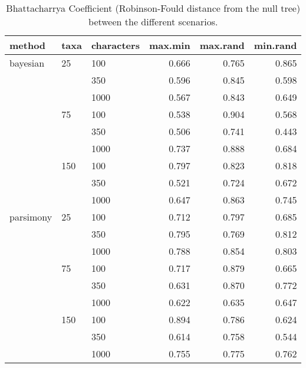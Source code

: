 \begin{table}[ht]
\centering
\begin{tabular}{lllrrr}
  \hline
method & taxa & characters & max.min & max.rand & min.rand \\ 
  \hline
bayesian & 25 & 100 & 0.666 & 0.765 & 0.865 \\ 
   &  & 350 & 0.596 & 0.845 & 0.598 \\ 
   &  & 1000 & 0.567 & 0.843 & 0.649 \\ 
   & 75 & 100 & 0.538 & 0.904 & 0.568 \\ 
   &  & 350 & 0.506 & 0.741 & 0.443 \\ 
   &  & 1000 & 0.737 & 0.888 & 0.684 \\ 
   & 150 & 100 & 0.797 & 0.823 & 0.818 \\ 
   &  & 350 & 0.521 & 0.724 & 0.672 \\ 
   &  & 1000 & 0.647 & 0.863 & 0.745 \\ 
  parsimony & 25 & 100 & 0.712 & 0.797 & 0.685 \\ 
   &  & 350 & 0.795 & 0.769 & 0.812 \\ 
   &  & 1000 & 0.788 & 0.854 & 0.803 \\ 
   & 75 & 100 & 0.717 & 0.879 & 0.665 \\ 
   &  & 350 & 0.631 & 0.870 & 0.772 \\ 
   &  & 1000 & 0.622 & 0.635 & 0.647 \\ 
   & 150 & 100 & 0.894 & 0.786 & 0.624 \\ 
   &  & 350 & 0.614 & 0.758 & 0.544 \\ 
   &  & 1000 & 0.755 & 0.775 & 0.762 \\ 
   \hline
\end{tabular}
\caption{Bhattacharrya Coefficient (Robinson-Fould distance from the null tree) between the different scenarios.} 
\label{Full_Tab_BCRFnull}
\end{table}
